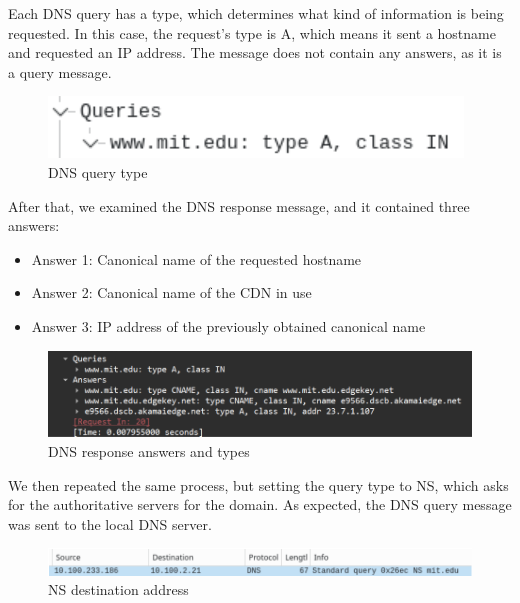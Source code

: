 Each DNS query has a type, which determines what kind of information is being
requested. In this case, the request's type is A, which means it sent a
hostname and requested an IP address. The message does not contain any answers,
as it is a query message.

\begin{figure}[htbp]
    \centering
    \includegraphics[width=1\linewidth]{img/17.png}
    \caption{DNS query type}\label{fig:17}
\end{figure}

After that, we examined the DNS response message, and it contained three
answers:

\begin{itemize}
    \item Answer 1: Canonical name of the requested hostname
    \item Answer 2: Canonical name of the CDN in use
    \item Answer 3: IP address of the previously obtained canonical name
\end{itemize}

\begin{figure}[htbp]
    \centering
    \includegraphics[width=1\linewidth]{img/18.png}
    \caption{DNS response answers and types}\label{fig:18}
\end{figure}

We then repeated the same process, but setting the query type to NS, which asks
for the authoritative servers for the domain. As expected, the DNS query
message was sent to the local DNS server.

\begin{figure}[htbp]
    \centering
    \includegraphics[width=1\linewidth]{img/19.png}
    \caption{NS destination address}\label{fig:19}
\end{figure}

